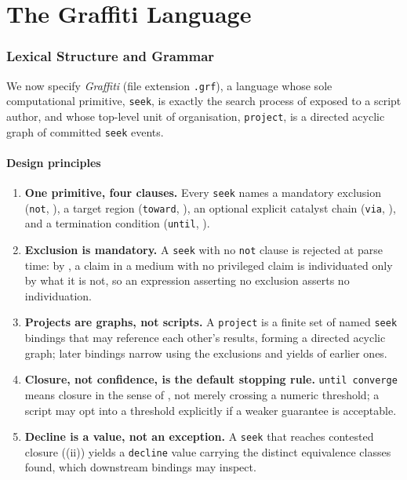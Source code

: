\documentclass[11pt,twocolumn,a4paper]{article}
\theoremstyle{thmstyle}
\theoremstyle{definition}
\theoremstyle{remark}
\begin{document}
\part{The Graffiti Language}

\section{Lexical Structure and Grammar}
\label{sec:language}

We now specify \emph{Graffiti} (file extension \texttt{.grf}), a language
whose sole computational primitive, \texttt{seek}, is exactly the search
process of  exposed to a script
author, and whose top-level unit of organisation, \texttt{project}, is a
directed acyclic graph of committed \texttt{seek} events.

\subsection{Design principles}

\begin{enumerate}[leftmargin=1.4em,itemsep=2pt]
\item \textbf{One primitive, four clauses.} Every \texttt{seek} names a
mandatory exclusion (\texttt{not}, ), a target region
(\texttt{toward}, ), an optional explicit catalyst chain
(\texttt{via}, ), and a termination condition
(\texttt{until}, ).
\item \textbf{Exclusion is mandatory.} A \texttt{seek} with no
\texttt{not} clause is rejected at parse time: by , a
claim in a medium with no privileged claim is individuated only by what it
is not, so an expression asserting no exclusion asserts no individuation.
\item \textbf{Projects are graphs, not scripts.} A \texttt{project} is a
finite set of named \texttt{seek} bindings that may reference each other's
results, forming a directed acyclic graph; later bindings narrow using
the exclusions and yields of earlier ones.
\item \textbf{Closure, not confidence, is the default stopping rule.}
\texttt{until converge} means closure in the sense of
, not merely crossing a numeric threshold; a script may
opt into a threshold explicitly if a weaker guarantee is acceptable.
\item \textbf{Decline is a value, not an exception.} A \texttt{seek} that
reaches contested closure ((ii)) yields a
\texttt{decline} value carrying the distinct equivalence classes found,
which downstream bindings may inspect.
\end{enumerate}
\end{document}
